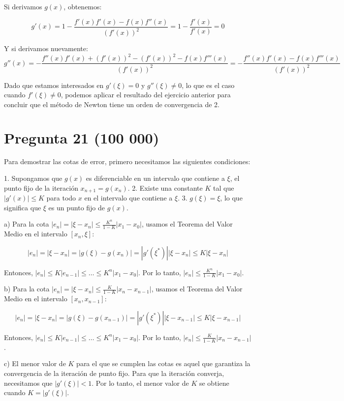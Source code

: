 \documentclass[a4paper,12pt]{article}
\begin{document}
Si derivamos \( g(x) \), obtenemos:

\[ g'(x) = 1 - \frac{f'(x)f'(x) - f(x)f''(x)}{(f'(x))^2} = 1 - \frac{f'(x)}{f'(x)} = 0 \]

Y si derivamos nuevamente:\[ g''(x) = -\frac{f''(x)f'(x) + (f'(x))^2 - (f'(x))^2 - f(x)f'''(x)}{(f'(x))^2} = -\frac{f''(x)f'(x) - f(x)f'''(x)}{(f'(x))^2} \]

Dado que estamos interesados en \( g'(\xi) = 0 \) y \( g''(\xi) \neq 0 \), lo que es el caso cuando \( f'(\xi) \neq 0 \), podemos aplicar el resultado del ejercicio anterior para concluir que el método de Newton tiene un orden de convergencia de 2.


\section*{Pregunta 21 (100 000)}
Para demostrar las cotas de error, primero necesitamos las siguientes condiciones:

1. Supongamos que \( g(x) \) es diferenciable en un intervalo que contiene a \( \xi \), el punto fijo de la iteración \( x_{n+1} = g(x_n) \).
2. Existe una constante \( K \) tal que \( |g'(x)| \leq K \) para todo \( x \) en el intervalo que contiene a \( \xi \).
3. \( g(\xi) = \xi \), lo que significa que \( \xi \) es un punto fijo de \( g(x) \).

a) Para la cota \( |e_n| = |\xi - x_n| \leq \frac{K^n}{1-K}|x_1 - x_0| \), usamos el Teorema del Valor Medio en el intervalo \( [x_n, \xi] \):

\[ |e_n| = |\xi - x_n| = |g(\xi) - g(x_n)| = |g'(\xi^*)||\xi - x_n| \leq K|\xi - x_n| \]

Entonces, \( |e_n| \leq K|e_{n-1}| \leq \dots \leq K^n |x_1 - x_0| \). Por lo tanto, \( |e_n| \leq \frac{K^n}{1-K}|x_1 - x_0| \).

b) Para la cota \( |e_n| = |\xi - x_n| \leq \frac{K}{1 - K}|x_{n} - x_{n-1}| \), usamos el Teorema del Valor Medio en el intervalo \( [x_n, x_{n-1}] \):

\[ |e_n| = |\xi - x_n| = |g(\xi) - g(x_{n-1})| = |g'(\xi^*)||\xi - x_{n-1}| \leq K|\xi - x_{n-1}| \]

Entonces, \( |e_n| \leq K|e_{n-1}| \leq \dots \leq K^n |x_1 - x_0| \). Por lo tanto, \( |e_n| \leq \frac{K}{1 - K}|x_{n} - x_{n-1}| \).

c) El menor valor de \( K \) para el que se cumplen las cotas es aquel que garantiza la convergencia de la iteración de punto fijo. Para que la iteración converja, necesitamos que \( |g'(\xi)| < 1 \). Por lo tanto, el menor valor de \( K \) se obtiene cuando \( K = |g'(\xi)| \).
\end{document}
